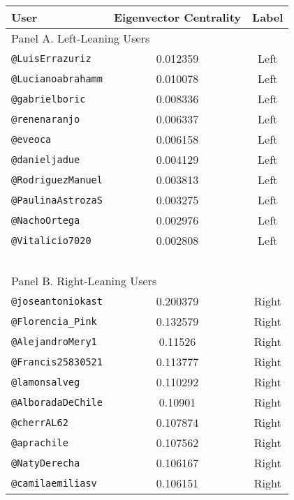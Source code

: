 %
    
    \begin{tabular}{lcc}
        \toprule\toprule
        User & Eigenvector Centrality & Label \\  \midrule
        \multicolumn{3}{l}{Panel A. Left-Leaning Users} \\  \midrule
        \texttt{@LuisErrazuriz} & 0.012359 & Left \\  
        \texttt{@Lucianoabrahamm} & 0.010078 & Left \\  
        \texttt{@gabrielboric} & 0.008336 & Left \\  
        \texttt{@renenaranjo} & 0.006337 & Left \\  
        \texttt{@eveoca} & 0.006158 & Left \\  
        \texttt{@danieljadue} & 0.004129 & Left \\  
        \texttt{@RodriguezManuel} & 0.003813 & Left \\  
        \texttt{@PaulinaAstrozaS} & 0.003275 & Left \\  
        \texttt{@NachoOrtega} & 0.002976 & Left \\  
        \texttt{@Vitalicio7020} & 0.002808 & Left \\   
        ~ & ~ & ~ \\  \midrule
        \multicolumn{3}{l}{Panel B. Right-Leaning Users} \\  \midrule
        \texttt{@joseantoniokast} & 0.200379 & Right \\  
        \texttt{@Florencia\_Pink} & 0.132579 & Right \\  
        \texttt{@AlejandroMery1} & 0.11526 & Right \\  
        \texttt{@Francis25830521} & 0.113777 & Right \\  
        \texttt{@lamonsalveg} & 0.110292 & Right \\  
        \texttt{@AlboradaDeChile} & 0.10901 & Right \\  
        \texttt{@cherrAL62} & 0.107874 & Right \\  
        \texttt{@aprachile} & 0.107562 & Right \\  
        \texttt{@NatyDerecha} & 0.106167 & Right \\  
        \texttt{@camilaemiliasv} & 0.106151 & Right \\   
        \bottomrule\bottomrule
    \end{tabular}

%